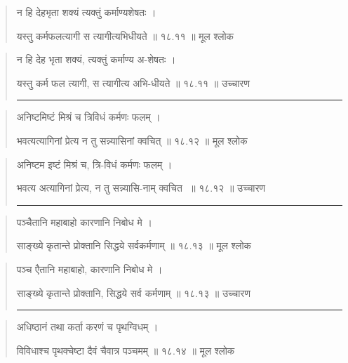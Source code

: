 \begin{quotation}

न हि देहभृता शक्यं त्यक्तुं कर्माण्यशेषतः  ।  

यस्तु कर्मफलत्यागी स त्यागीत्यभिधीयते  ॥ १८.११ ॥  मूल श्लोक
\end{quotation}

\begin{quotation}
न हि देह भृता शक्यं, त्यक्तुं कर्माण्य अ-शेषतः  ।  

यस्तु कर्म फल त्यागी, स त्यागीत्य अभि-धीयते  ॥ १८.११ ॥  उच्चारण

\noindent\rule{16cm}{0.4pt} 
\end{quotation}


\begin{quotation}

अनिष्टमिष्टं मिश्रं च त्रिविधं कर्मणः फलम्‌  ।  

भवत्यत्यागिनां प्रेत्य न तु सन्न्यासिनां क्वचित्‌  ॥ १८.१२ ॥  मूल श्लोक
\end{quotation}

\begin{quotation}

अनिष्टम इष्टं मिश्रं च, त्रि-विधं कर्मणः फलम्‌  ।  

भवत्य अत्यागिनां प्रेत्य, न तु सन्न्यासि-नाम् क्वचित ‌ ॥ १८.१२ ॥  उच्चारण

\noindent\rule{16cm}{0.4pt} 
\end{quotation}


\begin{quotation}

पञ्चैतानि महाबाहो कारणानि निबोध मे  ।  

साङ्ख्ये कृतान्ते प्रोक्तानि सिद्धये सर्वकर्मणाम्‌  ॥ १८.१३ ॥  मूल श्लोक
\end{quotation}

\begin{quotation}

पञ्च एैतानि महाबाहो, कारणानि निबोध मे  ।  

साङ्ख्ये कृतान्ते प्रोक्तानि, सिद्धये सर्व कर्मणाम्‌  ॥ १८.१३ ॥  उच्चारण

\noindent\rule{16cm}{0.4pt} 
\end{quotation}


\begin{quotation}

अधिष्ठानं तथा कर्ता करणं च पृथग्विधम्‌  ।  

विविधाश्च पृथक्चेष्टा दैवं चैवात्र पञ्चमम्‌  ॥ १८.१४ ॥  मूल श्लोक
\end{quotation}

